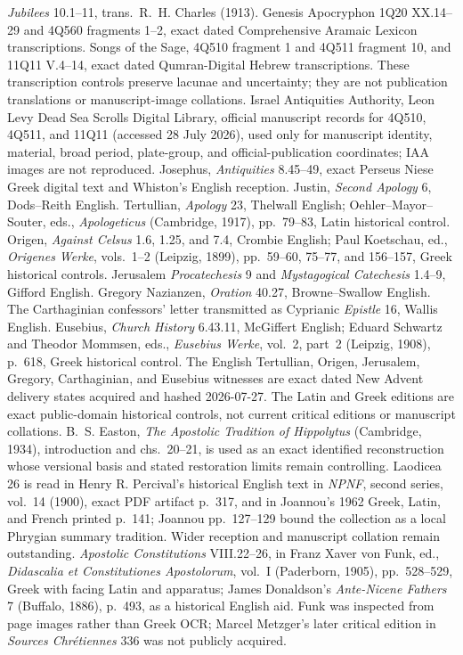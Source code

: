 \emph{Jubilees} 10.1--11, trans.\ R.~H. Charles (1913). Genesis Apocryphon
1Q20 XX.14--29 and 4Q560 fragments 1--2, exact dated Comprehensive Aramaic
Lexicon transcriptions. Songs of the Sage, 4Q510 fragment 1 and 4Q511
fragment 10, and 11Q11 V.4--14, exact dated Qumran-Digital Hebrew
transcriptions. These transcription controls preserve lacunae and uncertainty;
they are not publication translations or manuscript-image collations.
Israel Antiquities Authority, Leon Levy Dead Sea Scrolls Digital Library,
official manuscript records for 4Q510, 4Q511, and 11Q11 (accessed 28 July
2026), used only for manuscript identity, material, broad period, plate-group,
and official-publication coordinates; IAA images are not reproduced.
Josephus,
\emph{Antiquities} 8.45--49, exact Perseus Niese Greek digital text and
Whiston's English reception. Justin,
\emph{Second Apology} 6, Dods--Reith English. Tertullian,
\emph{Apology} 23, Thelwall English; Oehler--Mayor--Souter, eds.,
\emph{Apologeticus} (Cambridge, 1917), pp.~79--83, Latin historical control.
Origen, \emph{Against Celsus} 1.6, 1.25, and 7.4, Crombie English; Paul
Koetschau, ed., \emph{Origenes Werke}, vols.~1--2 (Leipzig, 1899),
pp.~59--60, 75--77, and 156--157, Greek historical controls. Jerusalem
\emph{Procatechesis} 9 and \emph{Mystagogical Catechesis} 1.4--9, Gifford
English. Gregory Nazianzen, \emph{Oration} 40.27, Browne--Swallow English.
The Carthaginian confessors' letter transmitted as Cyprianic
\emph{Epistle} 16, Wallis English. Eusebius,
\emph{Church History} 6.43.11, McGiffert English; Eduard
Schwartz and Theodor Mommsen, eds., \emph{Eusebius Werke}, vol.~2, part~2
(Leipzig, 1908), p.~618, Greek historical control. The English Tertullian,
Origen, Jerusalem, Gregory, Carthaginian, and Eusebius witnesses are exact
dated New Advent delivery states acquired and hashed 2026-07-27. The Latin
and Greek editions are exact public-domain historical controls, not current
critical editions or manuscript collations. B.~S. Easton,
\emph{The Apostolic Tradition of Hippolytus} (Cambridge, 1934), introduction
and chs.~20--21, is used as an exact identified reconstruction whose versional
basis and stated restoration limits remain controlling. Laodicea 26 is read
in Henry R. Percival's historical English text in \emph{NPNF}, second series,
vol.~14 (1900), exact PDF artifact p.~317, and in Joannou's 1962 Greek, Latin,
and French printed p.~141; Joannou pp.~127--129 bound the collection as a local
Phrygian summary tradition. Wider reception and manuscript collation remain
outstanding.
\emph{Apostolic Constitutions} VIII.22--26, in Franz Xaver von Funk, ed.,
\emph{Didascalia et Constitutiones Apostolorum}, vol.~I (Paderborn, 1905),
pp.~528--529, Greek with facing Latin and apparatus; James Donaldson's
\emph{Ante-Nicene Fathers} 7 (Buffalo, 1886), p.~493, as a historical English
aid. Funk was inspected from page images rather than Greek OCR; Marcel
Metzger's later critical edition in \emph{Sources Chrétiennes} 336 was not
publicly acquired.

